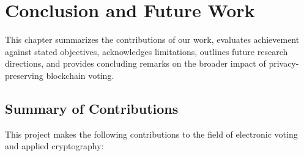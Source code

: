 \chapter{Conclusion and Future Work}\label{ch:conclusion}

This chapter summarizes the contributions of our work, evaluates achievement against stated objectives, acknowledges limitations, outlines future research directions, and provides concluding remarks on the broader impact of privacy-preserving blockchain voting.

\section{Summary of Contributions}

This project makes the following contributions to the field of electronic voting and applied cryptography:

